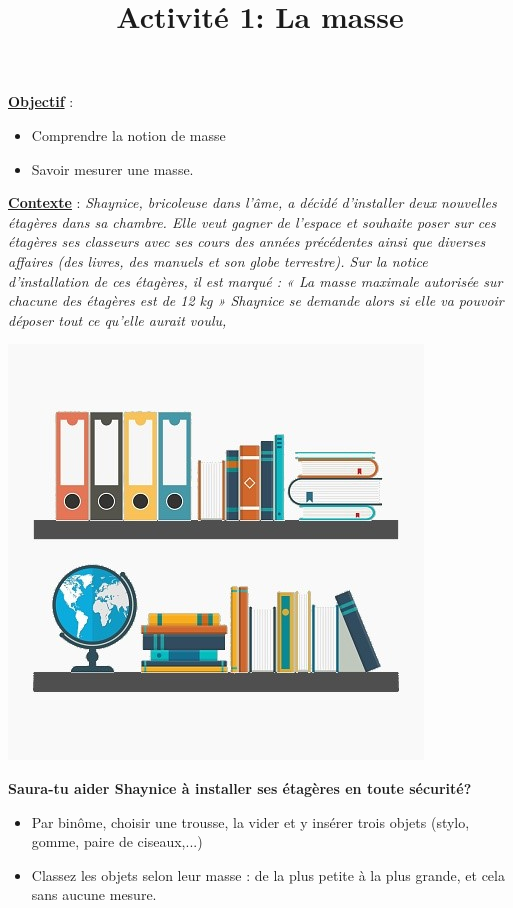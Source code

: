 \documentclass[10pt]{article}
\newcommand{\titreActivite}{Activité 1: La masse} %
\newcommand{\objectif}{ 	
	
	\begin{itemize}
		\item Comprendre la notion de masse
		\item Savoir mesurer une masse.
	\end{itemize}
} %
\newcommand{\contexte}{
	Shaynice, bricoleuse dans l’âme, a décidé d’installer deux nouvelles étagères
	dans sa chambre. Elle veut gagner de l’espace et souhaite poser sur ces
	étagères ses classeurs avec ses cours des années précédentes ainsi que
	diverses affaires (des livres, des manuels et son globe terrestre).
	Sur la notice d’installation de ces étagères, il est marqué :
	« La masse maximale autorisée sur chacune des étagères est de 12 kg »
	Shaynice se demande alors si elle va pouvoir déposer tout ce qu’elle aurait voulu, 
}
\newcommand{\resumeContexte}{
	Saura-tu aider Shaynice à installer ses étagères en toute sécurité?
	}
\begin{document}
\date{}
\title{\titreActivite}
\maketitle %


\underline{\textbf{Objectif}} :  \vspace{2pt}
\objectif

\vspace{4pt}

\underline{\textbf{Contexte}} :  \textit{\contexte}

\begin{center}
	\includegraphics[width=0.55\columnwidth]{assets/img-005.png} %
\end{center}

\textbf{\resumeContexte}
\vspace{-12pt}



\begin{question}
	\begin{itemize}
		\item Par binôme, choisir une trousse, la vider et y insérer trois objets (stylo, gomme, paire de ciseaux,...)
		\item Classez les objets selon leur masse : de la plus petite à la plus grande, et cela
		sans aucune mesure.
	\end{itemize}
\end{question}
\end{document}
